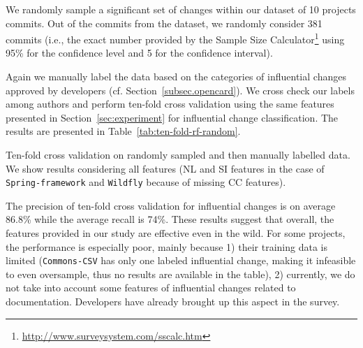We randomly sample a significant set of changes within our dataset of 10 projects commits. 
Out of the \numChanges commits from the dataset, we randomly consider 381 commits (i.e., the
exact number provided by the Sample Size
Calculator\footnote{\url{http://www.surveysystem.com/sscalc.htm}} using
95\% for the confidence level and 5 for the confidence interval).

Again we manually label the data based on the categories of influential changes approved by developers (cf. Section~\ref{subsec.opencard}).
We cross check our labels among authors and perform ten-fold cross validation using the same features presented in Section~\ref{sec:experiment} for
influential change classification. The results are presented in Table~\ref{tab:ten-fold-rf-random}.

\begin{table}[h!]
\caption{Ten-fold cross validation on randomly sampled
and then manually labelled data. We show results considering all features (NL
and SI features in the case of {\tt Spring-framework} and {\tt Wildfly}
because of missing CC features).}

\label{tab:ten-fold-rf-random}
    
\end{table}

The precision of ten-fold cross validation for influential changes is on average 86.8\% while the average recall
is 74\%. These results suggest that overall, the features provided in our
study are effective even in the wild. For some projects, the performance is
especially poor, mainly because 1) their training data is limited ({\tt Commons-CSV}
has only one labeled influential change, making it infeasible to even oversample, thus
no results are available in the table), 2) currently, we do not take into account some features
of influential changes related to documentation. Developers have already brought up this aspect in the survey.

